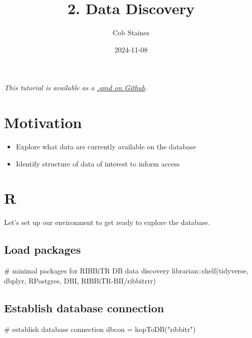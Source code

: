 \documentclass[
  letterpaper,
  DIV=11,
  numbers=noendperiod]{scrartcl}
\title{2. Data Discovery}
\author{Cob Staines}
\date{2024-11-08}
\newenvironment{Shaded}{\begin{snugshade}}{\end{snugshade}}
\newcommand{\CommentTok}[1]{\textcolor[rgb]{0.37,0.37,0.37}{#1}}
\newcommand{\FunctionTok}[1]{\textcolor[rgb]{0.28,0.35,0.67}{#1}}
\newcommand{\NormalTok}[1]{\textcolor[rgb]{0.00,0.23,0.31}{#1}}
\newcommand{\OtherTok}[1]{\textcolor[rgb]{0.00,0.23,0.31}{#1}}
\newcommand{\SpecialCharTok}[1]{\textcolor[rgb]{0.37,0.37,0.37}{#1}}
\newcommand{\StringTok}[1]{\textcolor[rgb]{0.13,0.47,0.30}{#1}}
\providecommand{\tightlist}{%
  \setlength{\itemsep}{0pt}\setlength{\parskip}{0pt}}\usepackage{longtable,booktabs,array}
\renewcommand*\contentsname{Table of contents}
\newcommand\contentsname{Table of contents}
\begin{document}
\maketitle

\renewcommand*\contentsname{Table of contents}
{
\hypersetup{linkcolor=}
\setcounter{tocdepth}{3}
\tableofcontents
}

\emph{This tutorial is available as a
\href{https://github.com/RIBBiTR-BII/ribbitr-data-access/tree/main/tutorial_series}{.qmd
on Github}.}

\section{Motivation}\label{motivation}

\begin{itemize}
\tightlist
\item
  Explore what data are currently available on the database
\item
  Identify structure of data of interest to inform access
\end{itemize}

\section{R}

Let's set up our environment to get ready to explore the database.

\subsection{Load packages}\label{load-packages}

\begin{Shaded}
\begin{Highlighting}[]
\CommentTok{\# minimal packages for RIBBiTR DB data discovery}
\NormalTok{librarian}\SpecialCharTok{::}\FunctionTok{shelf}\NormalTok{(tidyverse, dbplyr, RPostgres, DBI, RIBBiTR}\SpecialCharTok{{-}}\NormalTok{BII}\SpecialCharTok{/}\NormalTok{ribbitrrr)}
\end{Highlighting}
\end{Shaded}

\subsection{Establish database
connection}\label{establish-database-connection}

\begin{Shaded}
\begin{Highlighting}[]
\CommentTok{\# establish database connection}
\NormalTok{dbcon }\OtherTok{=} \FunctionTok{hopToDB}\NormalTok{(}\StringTok{"ribbitr"}\NormalTok{)}
\end{Highlighting}
\end{Shaded}
\end{document}

